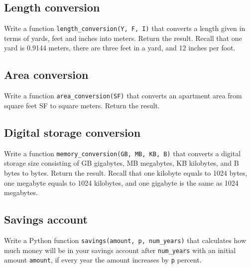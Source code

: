 
\subsection{Length conversion}

Write a function {\tt length\_conversion(Y, F, I)} that converts a length given
in terms of yards, feet and inches into meters. Return the result. Recall 
that one yard is 0.9144 meters, there are three feet in a yard, and 
12 inches per foot.


\subsection{Area conversion}

Write a function {\tt area\_conversion(SF)} that converts an apartment 
area from square feet SF to square meters. Return the result. 


\subsection{Digital storage conversion}

Write a function {\tt memory\_conversion(GB, MB, KB, B)} that converts a digital storage 
size consisting of GB gigabytes, MB megabytes, KB kilobytes, and 
B bytes to bytes. Return the result. Recall that one kilobyte 
equals to 1024 bytes, one megabyte equals to 1024 kilobytes, and 
one gigabyte is the same as 1024 megabytes.


\subsection{Savings account}

Write a Python function {\tt savings(amount, p, num\_years)} that calculates
how much money will be in your savings account after {\tt num\_years} with 
an initial amount {\tt amount}, if every year the amount increases by {\tt p}
percent.


